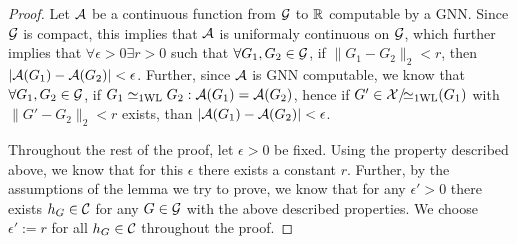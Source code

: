 \begin{proof}
    Let $\mathcal{A}$ be a continuous function from $\mathcal{G}$ to $\mathbb{R}$ computable by a GNN. Since $\mathcal{G}$ is compact, this implies that $\mathcal{A}$ is uniformaly continuous on $\mathcal{G}$, which further implies that $\forall \epsilon > 0 \exists r > 0$ such that $\forall G_1, G_2 \in \mathcal{G}$, if $\| G_1 - G_2 \|_2 < r$, then $|\mathcal{A}(G_1) - \mathcal{A}(G_2)| < \epsilon$. Further, since $\mathcal{A}$ is GNN computable, we know that $\forall G_1, G_2 \in \mathcal{G}$, if $G_1 \simeq_{\text{1WL}} G_2: \mathcal{A}(G_1) = \mathcal{A}(G_2)$, hence if $G' \in \mathcal{X}/\!{\simeq_{\text{1WL}}}(G_1)$ with $\| G' - G_2 \|_2 < r$ exists, than $|\mathcal{A}(G_1) - \mathcal{A}(G_2)| < \epsilon$.\newline

    Throughout the rest of the proof, let $\epsilon > 0$ be fixed. Using the property described above, we know that for this $\epsilon$ there exists a constant $r$. Further, by the assumptions of the lemma we try to prove, we know that for any $\epsilon' > 0$ there exists $h_{G} \in \mathcal{C}$ for any $G \in \mathcal{G}$ with the above described properties. We choose $\epsilon' := r$ for all $h_{G} \in \mathcal{C}$ throughout the proof.\newline


\end{proof}
